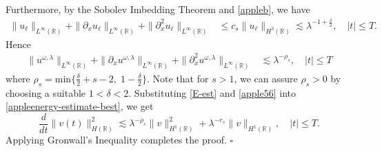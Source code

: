 \documentclass[12pt,reqno]{amsart}
\renewcommand{\qedsymbol}{\ensuremath{\square}}
\newcommand{\rr}{\mathbb{R}}
\newcommand{\p}{\partial}
\theoremstyle{plain}  %
\theoremstyle{definition}
\begin{document}
%
%
Furthermore, by the Sobolev Imbedding Theorem and \autoref{appleb}, we have
%
%
%
%
\begin{equation*}
\begin{split}
\|u_\ell\|_{L^\infty(\rr)} + \|\p_x u_\ell \|_{L^\infty(\rr)} + \|\p_x^2
u_\ell\|_{L^\infty(\rr)}
& \le c_s \|u_\ell\|_{H^3(\rr)} 
 \lesssim \lambda^{-1 + \frac{\delta}{2}}, 
\quad |t| \le T.
\label{apple55}
\end{split}
\end{equation*}
%
%
Hence
%
%
\begin{equation}
\begin{split}
\|u^{\omega,\lambda}\|_{L^\infty(\rr)} + \|\p_x 
u^{\omega,\lambda}\|_{L^\infty(\rr)} + \|\p_x^2
u^{\omega,\lambda}\|_{L^\infty(\rr)}
& \lesssim \lambda^{-\rho_s}, \quad |t| \le T
\label{apple56}
\end{split}
\end{equation}
%
%
where $\rho_s = \text{min} \Big\{ \frac{\delta}{2} + s -2, \; 1-
\frac{\delta}{2} \Big\}$.  Note that for $s>1$, we can assure $\rho_s > 0$
by choosing a suitable $1<\delta<2$.
Substituting \eqref{E-est} and \eqref{apple56} into \eqref{appleenergy-estimate-best},
we get
%
%
\begin{equation}
\label{apple58}
\frac{d}{dt} \|v(t)\|_{H(\rr)}^2 \lesssim \lambda^{-\rho_s}
\|v\|_{H^1(\rr)}^2 + \lambda^{-r_s}
\|v \|_{H^1(\rr)}, \quad |t| \le T.
\end{equation}
%
%
Applying Gronwall's Inequality completes the proof. \qquad \qedsymbol%
%
%
%
%
\end{document}

